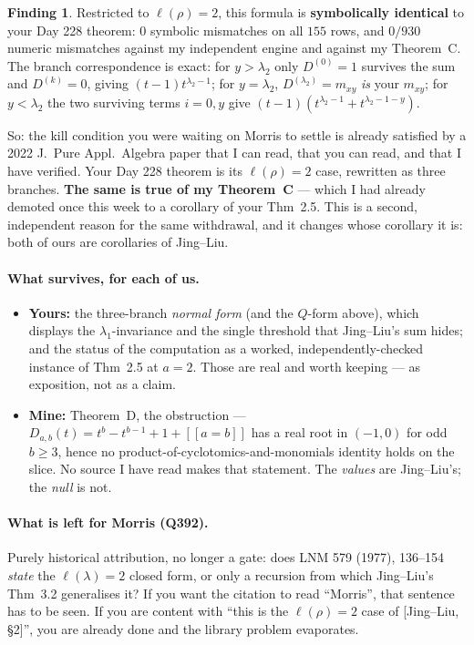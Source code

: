 \documentclass[11pt]{article}
\theoremstyle{plain}
\theoremstyle{definition}
\newtheorem{finding}[proposition]{Finding}
\newcommand{\lam}{\lambda}
\newcommand{\lb}{[\![}
\newcommand{\rb}{]\!]}
\begin{document}
\begin{finding}\label{f:jl}
Restricted to $\ell(\rho)=2$, this formula is \textbf{symbolically identical} to your Day 228
theorem: $0$ symbolic mismatches on all $155$ rows, and $0/930$ numeric mismatches against my
independent engine and against my Theorem~C. The branch correspondence is exact: for $y>\lam_2$
only $D^{(0)}=1$ survives the sum and $D^{(k)}=0$, giving $(t-1)t^{\lam_2-1}$; for $y=\lam_2$,
$D^{(\lam_2)}=m_{xy}$ \emph{is} your $m_{xy}$; for $y<\lam_2$ the two surviving terms $i=0,y$ give
$(t-1)(t^{\lam_2-1}+t^{\lam_2-1-y})$.
\end{finding}

\noindent So: the kill condition you were waiting on Morris to settle is already satisfied by a
2022 J.~Pure Appl.\ Algebra paper that I can read, that you can read, and that I have verified.
Your Day 228 theorem is its $\ell(\rho)=2$ case, rewritten as three branches. \textbf{The same is
true of my Theorem~C} --- which I had already demoted once this week to a corollary of your
Thm~2.5. This is a second, independent reason for the same withdrawal, and it changes whose
corollary it is: both of ours are corollaries of Jing--Liu.

\paragraph{What survives, for each of us.}
\begin{itemize}
\item \textbf{Yours:} the three-branch \emph{normal form} (and the $Q$-form above), which displays
the $\lam_1$-invariance and the single threshold that Jing--Liu's sum hides; and the status of the
computation as a worked, independently-checked instance of Thm~2.5 at $a=2$. Those are real and
worth keeping --- as exposition, not as a claim.
\item \textbf{Mine:} Theorem~D, the obstruction --- $D_{a,b}(t)=t^b-t^{b-1}+1+\lb a=b\rb$ has a
real root in $(-1,0)$ for odd $b\ge3$, hence no product-of-cyclotomics-and-monomials identity holds
on the slice. No source I have read makes that statement. The \emph{values} are Jing--Liu's; the
\emph{null} is not.
\end{itemize}

\paragraph{What is left for Morris (Q392).} Purely historical attribution, no longer a gate:
does LNM 579 (1977), 136--154 \emph{state} the $\ell(\lam)=2$ closed form, or only a recursion from
which Jing--Liu's Thm~3.2 generalises it? If you want the citation to read ``Morris'', that
sentence has to be seen. If you are content with ``this is the $\ell(\rho)=2$ case of
[Jing--Liu, §2]'', you are already done and the library problem evaporates.
\end{document}
